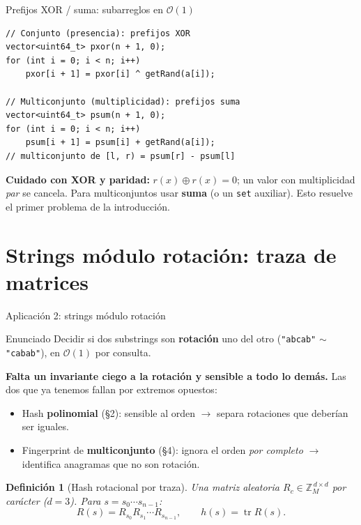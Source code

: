\documentclass{beamer}
\newtheorem{definicion}{Definición}
\begin{document}
\begin{frame}[fragile]{Prefijos XOR / suma: subarreglos en $\mathcal{O}(1)$}
\begin{verbatim}
// Conjunto (presencia): prefijos XOR
vector<uint64_t> pxor(n + 1, 0);
for (int i = 0; i < n; i++)
    pxor[i + 1] = pxor[i] ^ getRand(a[i]);

// Multiconjunto (multiplicidad): prefijos suma
vector<uint64_t> psum(n + 1, 0);
for (int i = 0; i < n; i++)
    psum[i + 1] = psum[i] + getRand(a[i]);
// multiconjunto de [l, r) = psum[r] - psum[l]
\end{verbatim}
\textbf{Cuidado con XOR y paridad:} $r(x)\oplus r(x)=0$; un valor con multiplicidad \emph{par} se cancela. Para multiconjuntos usar \textbf{suma} (o un \texttt{set} auxiliar). Esto resuelve el primer problema de la introducción.
\end{frame}

\section{Strings módulo rotación: traza de matrices}

\begin{frame}{Aplicación 2: strings módulo rotación}
\begin{block}{Enunciado}
Decidir si dos substrings son \textbf{rotación} uno del otro (\texttt{"abcab"} $\sim$ \texttt{"cabab"}), en $\mathcal{O}(1)$ por consulta.
\end{block}
\pause
\textbf{Falta un invariante ciego a la rotación y sensible a todo lo demás.} Las dos que ya tenemos fallan por extremos opuestos:
\begin{itemize}
    \item Hash \textbf{polinomial} (\S2): sensible al orden $\to$ separa rotaciones que deberían ser iguales.
    \item Fingerprint de \textbf{multiconjunto} (\S4): ignora el orden \emph{por completo} $\to$ identifica anagramas que no son rotación.
\end{itemize}
\pause
\begin{definicion}[Hash rotacional por traza]
Una matriz aleatoria $R_c \in \mathbb{Z}_M^{\,d\times d}$ por carácter ($d = 3$). Para $s = s_0\cdots s_{n-1}$:
\[
R(s) = R_{s_0}R_{s_1}\cdots R_{s_{n-1}}, \qquad h(s) = \operatorname{tr} R(s).
\]
\end{definicion}
\end{frame}
\end{document}
